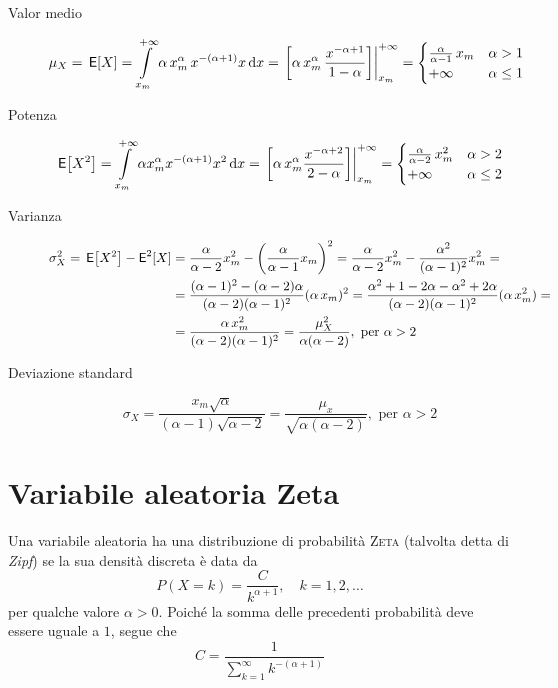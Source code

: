 \begin{description}
\item[Valor medio]
\begin{equation}
	\mu_X=\E{X}=\intd{x_m}{+\infty}{\alpha\,x_m^\alpha\,x^{-(\alpha +1)} x}{x}=
	\bound{x_m}{+\infty}{\alpha\,x_m^\alpha\,\frac{x^{-\alpha +1}}{1-\alpha}}=
	\begin{cases}
		\frac{\alpha}{\alpha -1}\,x_m & \alpha>1\\
		+\infty & \alpha\leq 1
	\end{cases}
\end{equation}

\item[Potenza]
\begin{equation}
	\E{X^2}=\intd{x_m}{+\infty}{\alpha x_m^\alpha x^{-(\alpha +1)}x^2}{x}=
	\bound{x_m}{+\infty}{\alpha\, x_m^\alpha \frac{x^{-\alpha +2}}{2-\alpha}}=
	\begin{cases}
		\frac{\alpha}{\alpha -2}\,x_m^2 & \alpha>2 \\
		+\infty & \alpha\leq 2
	\end{cases}
\end{equation}

\item[Varianza]
\begin{equation}
\begin{split}
	\sigma_X^2=\E{X^2}-\Esp^2[X] &=
		\frac{\alpha}{\alpha -2} x_m^2-\left(\frac{\alpha}{\alpha-1} x_m \right)^2=
		\frac{\alpha}{\alpha -2} x_m^2-\frac{\alpha^2}{(\alpha-1)^2} x_m^2=\\
	&=\frac{(\alpha -1)^2-(\alpha -2)\alpha}{(\alpha -2)(\alpha -1)^2}(\alpha\,x_m)^2=
		\frac{\alpha^2 +1 -2\alpha -\alpha^2 +2\alpha}{(\alpha -2)(\alpha -1)^2} (\alpha\,x_m^2) = \\
	&=\frac{\alpha\,x_m^2}{(\alpha -2)(\alpha -1)^2}=\frac{\mu_X^2}{\alpha (\alpha -2)},\text{ per }\alpha>2
\end{split}
\end{equation}

\item[Deviazione standard]
\begin{equation}
	\sigma_X=\frac{x_m \sqrt{\alpha}}{(\alpha -1)\sqrt{\alpha -2}}= \frac{\mu_x}{\sqrt{\alpha(\alpha -2)}},\text{ per }\alpha>2
\end{equation}
\end{description}

\section{Variabile aleatoria Zeta}
Una variabile aleatoria ha una distribuzione di probabilità \textsc{Zeta} (talvolta detta di \emph{Zipf}) se la sua densità discreta è data da
\begin{equation}
	P(X = k) = \frac{C}{k^{\alpha+1}},
	\quad k=1,2,\dots
\end{equation}
per qualche valore $\alpha > 0$. Poiché la somma delle precedenti probabilità deve essere uguale a $1$, segue che
\begin{equation}
	C = \frac{1}{\sum\limits_{k=1}^{\infty} k^{-(\alpha+1)}}
\end{equation}

